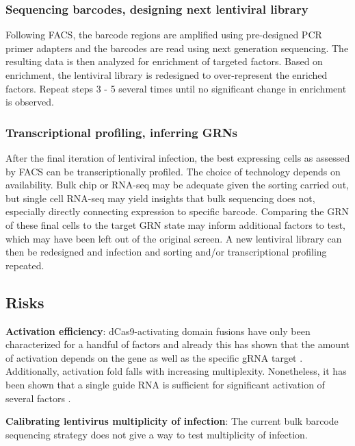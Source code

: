 \documentclass[10pt]{article}
\begin{document}
\subsubsection{Sequencing barcodes, designing next lentiviral library}

Following FACS, the barcode regions are amplified using pre-designed PCR primer adapters \cite{cheng2014enhanced} and the barcodes are read using next generation sequencing. The resulting data is then analyzed for enrichment of targeted factors. Based on enrichment, the lentiviral library is redesigned to over-represent the enriched factors. Repeat steps 3 - 5 several times until no significant change in enrichment is observed.

\subsubsection{Transcriptional profiling, inferring GRNs}

After the final iteration of lentiviral infection, the best expressing cells as assessed by FACS can be transcriptionally profiled. The choice of technology depends on availability. Bulk chip or RNA-seq may be adequate given the sorting carried out, but single cell RNA-seq may yield insights that bulk sequencing does not, especially directly connecting expression to specific barcode. Comparing the GRN of these final cells to the target GRN state may inform additional factors to test, which may have been left out of the original screen. A new lentiviral library can then be redesigned and infection and sorting and/or transcriptional profiling repeated.

\subsection{Risks}

\textbf{Activation efficiency}: dCas9-activating domain fusions have only been characterized for a handful of factors and already this has shown that the amount of activation depends on the gene as well as the specific gRNA target \cite{chavez2015VPR, konermann2014genome}. Additionally, activation fold falls with increasing multiplexity. Nonetheless, it has been shown that a single guide RNA is sufficient for significant activation of several factors \cite{konermann2014genome}.
\newline

\noindent \textbf{Calibrating lentivirus multiplicity of infection}: The current bulk barcode sequencing strategy does not give a way to test multiplicity of infection.
\newline
\end{document}
